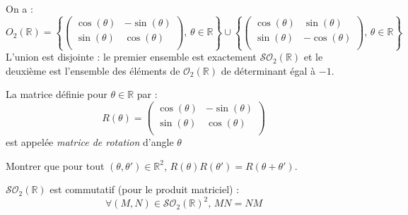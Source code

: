 \documentclass[a4paper,10pt]{report}
\begin{document}
\begin{thm}
On a :
$$ O_2(\mathbb{R}) = \left\lbrace \begin{pmatrix}
\cos(\theta) & - \sin(\theta) \\
\sin(\theta) & \cos(\theta) \\
\end{pmatrix}, \, \theta \in \mathbb{R} \right\rbrace \cup \left\lbrace \begin{pmatrix}
\cos(\theta) & \sin(\theta) \\
\sin(\theta) & -\cos(\theta) \\
\end{pmatrix}, \, \theta \in \mathbb{R} \right\rbrace$$
L'union est disjointe : le premier ensemble est exactement $\mathcal{SO}_2(\mathbb{R})$ et le deuxième est l'ensemble des éléments de $\mathcal{O}_2(\mathbb{R})$ de déterminant égal à $-1$.
\end{thm}

\begin{preuve}
\vspace{10cm}
\end{preuve}

\newpage

\begin{nota} La matrice définie pour $\theta \in \mathbb{R}$ par :
$$ R(\theta) =\begin{pmatrix}
\cos(\theta) & - \sin(\theta) \\
\sin(\theta) & \cos(\theta) \\
\end{pmatrix}$$
est appelée \textit{matrice de rotation} d'angle $\theta$
\end{nota}

\begin{exa} Montrer que pour tout $(\theta, \theta') \in \mathbb{R}^2$, $R(\theta) R(\theta') = R(\theta + \theta')$.
\end{exa}

\begin{prop} $\mathcal{SO}_2(\mathbb{R})$ est commutatif (pour le produit matriciel) : 
$$ \forall (M,N) \in \mathcal{SO}_2(\mathbb{R})^2, \,  MN=NM$$
\end{prop}

\begin{preuve}
\vspace{3cm}
\end{preuve}
\end{document}
